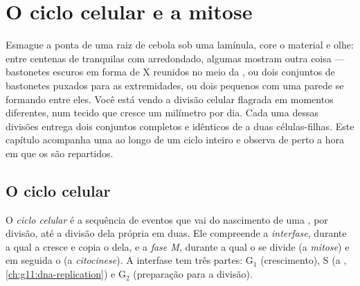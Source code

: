 \chapter{O ciclo celular e a mitose}\label{ch:g11:cell-cycle-mitosis}

Esmague a ponta de uma raiz de cebola sob uma lamínula, core o
material e olhe: entre centenas de  tranquilas com 
arredondado, algumas mostram outra coisa --- bastonetes escuros em
forma de X reunidos no meio da , ou dois conjuntos de bastonetes
puxados para as extremidades, ou dois  pequenos com uma parede
se formando entre eles. Você está vendo a divisão celular flagrada em
momentos diferentes, num tecido que cresce um milímetro por dia. Cada
uma dessas divisões entrega dois conjuntos completos e idênticos de
 a duas células-filhas. Este capítulo acompanha uma 
ao longo de um ciclo inteiro e observa de perto a hora em que os
 são repartidos.

\section{O ciclo celular}

\begin{definition}\label{def:g11:cell-cycle-mitosis:cycle}
O \emph{ciclo celular} é a sequência de eventos
que vai do nascimento de uma , por divisão, até a divisão dela
própria em duas. Ele compreende a \emph{interfase}, durante a qual a
 cresce e copia o  dela, e a \emph{fase M}, durante a qual o
 se divide (a \emph{mitose}) e em seguida o
 (a \emph{citocinese}). A interfase tem três partes:
$\mathrm{G_1}$ (crescimento), S (a ,
\cref{ch:g11:dna-replication}) e $\mathrm{G_2}$ (preparação para a
divisão).
\end{definition}


